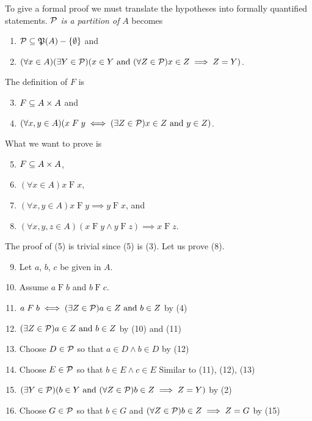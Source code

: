 \begin{solution}
To give a formal proof we must translate the hypotheses into formally quantified statements.
$\mathcal{P}$ \textit{is a partition of} $A$ becomes
\begin{enumerate}[label=(\arabic*)]
    \item $\mathcal{P}\subseteq \operatorname{\mathfrak{P}}(A)-\left\{\emptyset\right\}$ and
    \item $(\forall x\in A)(\exists Y\in\mathcal{P})(x\in Y\text{ and } (\forall Z\in\mathcal{P})x\in Z\implies Z=Y)$.
\end{enumerate}
The definition of $F$ is
\begin{enumerate}[label=(\arabic*)]
    \setcounter{enumi}{2}
    \item $F\subseteq A\times A$ and
    \item $(\forall x,y\in A)(x\mathrel{F}y \iff (\exists Z\in\mathcal{P})x\in Z\text{ and } y\in Z)$.
\end{enumerate}
What we want to prove is
\begin{enumerate}[label=(\arabic*)]
    \setcounter{enumi}{4}
    \item $F\subseteq A\times A$,
    \item $(\forall x\in A)x\mathrel F x$,
    \item $(\forall x, y\in A)x\mathrel F y \implies y \mathrel F x$, and
    \item $(\forall x,y,z\in A)(x\mathrel F y\land y\mathrel F z)\implies x\mathrel F z$.
\end{enumerate}
The proof of (5) is trivial since (5) is (3). Let us prove (8).
\begin{enumerate}[label=(\arabic*)]
    \setcounter{enumi}{8}
    \item Let $a$, $b$, $c$ be given in $A$.
    \item \quad Assume $a\mathrel F b$ and $b\mathrel F c$.
    \item \quad\quad $a\mathrel F b\iff (\exists Z\in\mathcal{P})a\in Z\text{ and } b\in Z$ \hfill by (4)
    \item \quad\quad $(\exists Z\in\mathcal{P})a\in Z\text{ and } b\in Z$ \hfill by (10) and (11)
    \item \quad\quad Choose $D\in\mathcal{P}$ so that $a\in D\land b\in D$ \hfill by (12)
    \item \quad\quad Choose $E\in\mathcal{P}$ so that $b\in E\land c\in E$ \hfill Similar to (11), (12), (13)
    \item \quad\quad $(\exists Y\in\mathcal{P})(b\in Y\text{ and } (\forall Z\in\mathcal{P})b\in Z\implies Z=Y)$ \hfill by (2)
    \item \quad\quad Choose $G\in\mathcal{P}$ so that $b\in G$ and $(\forall Z\in\mathcal{P})b\in Z\implies Z=G$ \hfill by (15)

\end{enumerate}
\end{solution}
